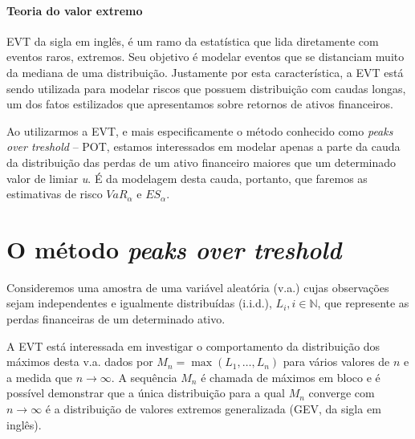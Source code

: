 \documentclass[review]{elsarticle}
\theoremstyle{definition}
\begin{document}
\paragraph{Teoria do valor extremo} EVT da sigla em inglês, é um ramo da estatística que lida diretamente com eventos raros, extremos. Seu objetivo é modelar eventos que se distanciam muito da mediana de uma distribuição. Justamente por esta característica, a EVT está sendo utilizada para modelar riscos que possuem distribuição com caudas longas, um dos fatos estilizados que apresentamos sobre retornos de ativos financeiros.

Ao utilizarmos a EVT, e mais especificamente o método conhecido como \emph{peaks over treshold} – POT, estamos interessados em modelar apenas a parte da cauda da distribuição das perdas de um ativo financeiro maiores que um determinado valor de limiar \emph{u}. É da modelagem desta cauda, portanto, que faremos as estimativas de risco $VaR_\alpha$ e $ES_\alpha$.

\section{O método \emph{peaks over treshold}}

Consideremos uma amostra de uma variável aleatória (v.a.) cujas observações sejam independentes e igualmente distribuídas (i.i.d.), $L_i,i\in \mathbb{N}$, que represente as perdas financeiras de um determinado ativo.

A EVT está interessada em investigar o comportamento da distribuição dos máximos desta v.a. dados por $M_n = \max (L_1, \ldots , L_n)$ para vários valores de $n$ e a medida que $n\rightarrow \infty$. A sequência $M_n$ é chamada de máximos em bloco e é possível demonstrar que a única distribuição para a qual $M_n$ converge com $n\rightarrow \infty$ é a distribuição de valores extremos generalizada (GEV, da sigla em inglês).

%
\end{document}
